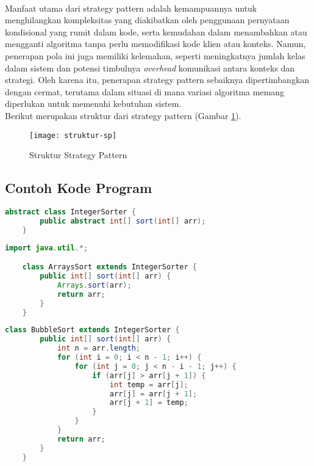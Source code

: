 \\
Manfaat utama dari strategy pattern adalah kemampuannya untuk menghilangkan kompleksitas yang diakibatkan oleh penggunaan pernyataan kondisional yang rumit dalam kode, serta kemudahan dalam menambahkan atau mengganti algoritma tanpa perlu memodifikasi kode klien atau konteks. Namun, penerapan pola ini juga memiliki kelemahan, seperti meningkatnya jumlah kelas dalam sistem dan potensi timbulnya \textit{overhead} komunikasi antara konteks dan strategi. Oleh karena itu, penerapan strategy pattern sebaiknya dipertimbangkan dengan cermat, terutama dalam situasi di mana variasi algoritma memang diperlukan untuk memenuhi kebutuhan sistem.
\\
Berikut merupakan struktur dari strategy pattern (Gambar \ref{fig:struktursp}).
\begin{figure}[h] 
	\centering  
	\texttt{[image: struktur-sp]}  
	\caption{Struktur Strategy Pattern}
	\label{fig:struktursp} 
\end{figure}
\newpage
\subsection{Contoh Kode Program}
\label{sec:kode}
\begin{lstlisting}[language=Java, caption=IntegerSorter.java]
    abstract class IntegerSorter {
        public abstract int[] sort(int[] arr);
    }
\end{lstlisting}

\begin{lstlisting}[language=Java, caption=ArraysSort.java]
    import java.util.*;

    class ArraysSort extends IntegerSorter {
        public int[] sort(int[] arr) {
            Arrays.sort(arr);
            return arr;
        }
    }
\end{lstlisting}

\begin{lstlisting}[language=Java, caption=BubbleSort.java]
    class BubbleSort extends IntegerSorter {
        public int[] sort(int[] arr) {
            int n = arr.length;
            for (int i = 0; i < n - 1; i++) {
                for (int j = 0; j < n - i - 1; j++) {
                    if (arr[j] > arr[j + 1]) {
                        int temp = arr[j];
                        arr[j] = arr[j + 1];
                        arr[j + 1] = temp;
                    }
                }
            }
            return arr;
        }
    }
\end{lstlisting}

